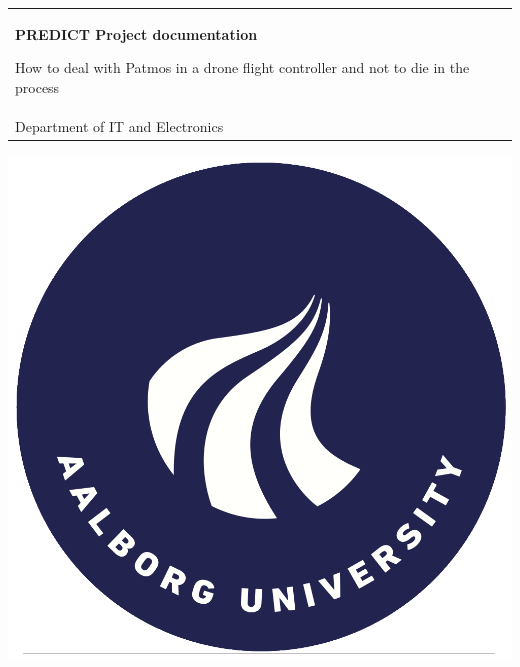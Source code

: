 \begin{titlepage}
\vspace*{\fill}
  \noindent%
  {\color{white}\colorbox{aaublue}{\begin{tabular}{@{}p{\textwidth}@{}}
    \begin{center}
    \Huge{\textbf{PREDICT Project documentation
    }}
    \end{center}
    \begin{center}
      \Large{How to deal with Patmos in a drone flight controller and not to die in the process}
    \end{center}
    \vspace{0.2cm}
   \begin{center}
    {\Large
      Carolina Gomez Salvatierra, Mark Adamik, Rahul Ravichandran}\\
    \vspace{0.2cm}
    {\large Department of IT and Electronics}
   \end{center}
   \vspace{0.2cm}

   \begin{center}
    {\Large \today}
   \end{center}
  \end{tabular}}}
  \vfill
  \begin{center}
     \includegraphics[width=0.3\paperwidth]{Figures/frontpage/AAUcircle.png}
  \end{center}
\end{titlepage}
\clearpage

\restoregeometry %